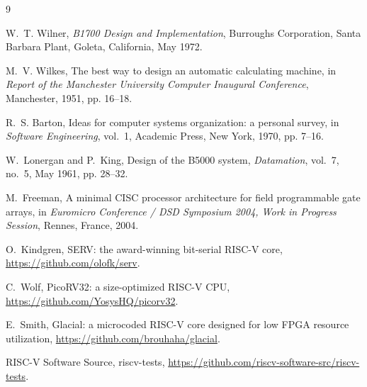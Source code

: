\documentclass[11pt,a4paper]{article}
\begin{document}
\begin{thebibliography}{9}

W.~T. Wilner,
\emph{B1700 Design and Implementation},
Burroughs Corporation, Santa Barbara Plant, Goleta, California, May 1972.

M.~V. Wilkes,
The best way to design an automatic calculating machine,
in \emph{Report of the Manchester University Computer Inaugural
Conference}, Manchester, 1951, pp. 16--18.

R.~S. Barton,
Ideas for computer systems organization: a personal survey,
in \emph{Software Engineering}, vol.~1, Academic Press, New York, 1970,
pp. 7--16.

W.~Lonergan and P.~King,
Design of the B5000 system,
\emph{Datamation}, vol.~7, no.~5, May 1961, pp. 28--32.

M.~Freeman,
A minimal CISC processor architecture for field programmable gate
arrays,
in \emph{Euromicro Conference / DSD Symposium 2004, Work in Progress
Session}, Rennes, France, 2004.

O.~Kindgren,
SERV: the award-winning bit-serial RISC-V core,
\url{https://github.com/olofk/serv}.

C.~Wolf,
PicoRV32: a size-optimized RISC-V CPU,
\url{https://github.com/YosysHQ/picorv32}.

E.~Smith,
Glacial: a microcoded RISC-V core designed for low FPGA resource
utilization,
\url{https://github.com/brouhaha/glacial}.

RISC-V Software Source,
riscv-tests,
\url{https://github.com/riscv-software-src/riscv-tests}.

\end{thebibliography}
\end{document}
